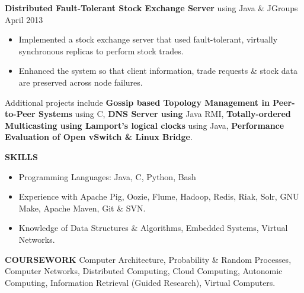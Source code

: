 \documentclass[10pt, letterpaper]{article}
\begin{document}

\textbf{Distributed Fault-Tolerant Stock Exchange Server} using Java \& JGroups \hfill April 2013
\begin{itemize}
    \item Implemented a stock exchange server that used fault-tolerant, virtually synchronous replicas to perform stock trades.
    \item Enhanced the system so that client information, trade requests \& stock data are preserved across node failures. %
\end{itemize}

Additional projects include 
\textbf{Gossip based Topology Management in Peer-to-Peer Systems} using C,  
\textbf{DNS Server using} Java RMI, 
\textbf{Totally-ordered Multicasting using Lamport's logical clocks} using Java, 
\textbf{Performance Evaluation of Open vSwitch \& Linux Bridge}.

\textbf{SKILLS}
\smallskip 
\begin{itemize}
    \item Programming Languages: Java, C, Python, Bash
    \item Experience with Apache Pig, Oozie, Flume, Hadoop, Redis, Riak, Solr, GNU Make, Apache Maven, Git \& SVN.
    \item Knowledge of Data Structures \& Algorithms, Embedded Systems, Virtual Networks.
\end{itemize} 

\textbf{COURSEWORK}
\smallskip 
\newline
Computer Architecture, Probability \& Random Processes, Computer Networks, 
Distributed Computing, Cloud Computing, Autonomic Computing, Information Retrieval (Guided Research), Virtual Computers.
\end{document}
